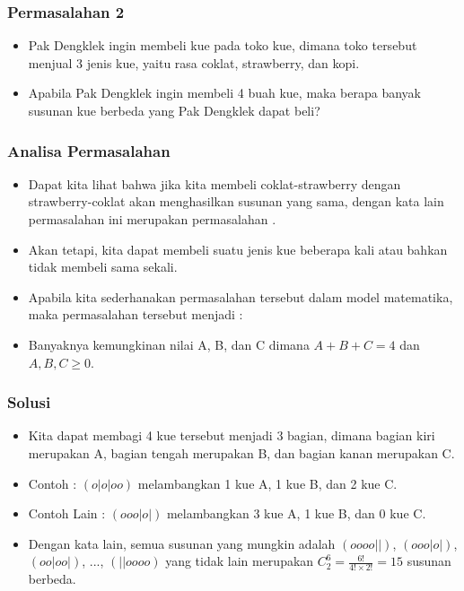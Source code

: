\begin{frame}
\frametitle{Permasalahan 2}
\begin{itemize}
  \item Pak Dengklek ingin membeli kue pada toko kue, dimana toko tersebut menjual 3 jenis kue, yaitu rasa coklat, strawberry, dan kopi.
  \item Apabila Pak Dengklek ingin membeli 4 buah kue, maka berapa banyak susunan kue berbeda yang Pak Dengklek dapat beli?
\end{itemize}
\end{frame}

\begin{frame}
\frametitle{Analisa Permasalahan}
\begin{itemize}
  \item Dapat kita lihat bahwa jika kita membeli coklat-strawberry dengan strawberry-coklat akan menghasilkan susunan yang sama, dengan kata lain permasalahan ini merupakan permasalahan .
  \item Akan tetapi, kita dapat membeli suatu jenis kue beberapa kali atau bahkan tidak membeli sama sekali.
  \item Apabila kita sederhanakan permasalahan tersebut dalam model matematika, maka permasalahan tersebut menjadi :
  \item Banyaknya kemungkinan nilai A, B, dan C dimana $A + B + C = 4$ dan $A,B,C \geq 0$.
\end{itemize}
\end{frame}

\begin{frame}
\frametitle{Solusi}
\begin{itemize}
  \item Kita dapat membagi 4 kue tersebut menjadi 3 bagian, dimana bagian kiri merupakan A, bagian tengah merupakan B, dan bagian kanan merupakan C.
  \item Contoh : $(o|o|oo)$ melambangkan 1 kue A, 1 kue B, dan 2 kue C.
  \item Contoh Lain : $(ooo|o|)$ melambangkan 3 kue A, 1 kue B, dan 0 kue C.
  \item Dengan kata lain, semua susunan yang mungkin adalah $(oooo||)$, $(ooo|o|)$, $(oo|oo|)$, ..., $(||oooo)$ yang tidak lain merupakan $C^{6}_{2} = \frac{6!}{4! \times 2!} = 15$ susunan berbeda.
\end{itemize}
\end{frame}

